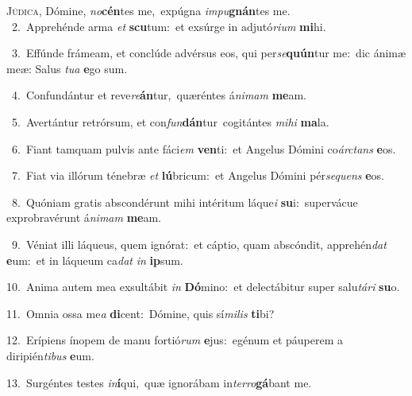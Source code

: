 \lettrine{\initial\textcolor{\initialcolor}{J}}{údica,} Dómine, \textit{no}\-\textbf{cén}tes me,~\star expúgna \textit{im}\-\textit{pu}\textbf{gnán}tes me.\\
{\numbfont\textcolor{\numbcolor}{~2.}}~Apprehénde arma \textit{et} \textbf{scu}\-tum:~\star et exsúrge in adjutó\-\textit{ri}\-\textit{um} \textbf{mi}\-hi.\par
{\numbfont\textcolor{\numbcolor}{~3.}}~Effúnde frámeam, et conclúde advérsus eos, qui per\-\textit{se}\-\textbf{quún}tur me:~\star dic ánimæ meæ: Salus \textit{tu}\-\textit{a} \textbf{e}\-go sum.\par
{\numbfont\textcolor{\numbcolor}{~4.}}~Confundántur et reve\-\textit{re}\-\textbf{án}tur,~\star quæréntes á\-\textit{ni}\-\textit{mam} \textbf{me}\-am.\par
{\numbfont\textcolor{\numbcolor}{~5.}}~Avertántur retrórsum, et con\-\textit{fun}\-\textbf{dán}tur~\star cogitántes \textit{mi}\-\textit{hi} \textbf{ma}\-la.\par
{\numbfont\textcolor{\numbcolor}{~6.}}~Fiant tamquam pulvis ante fáci\textit{em} \textbf{ven}\-ti:~\star et Angelus Dómini co\-\textit{árc}\-\textit{tans} \textbf{e}\-os.\par
{\numbfont\textcolor{\numbcolor}{~7.}}~Fiat via illórum ténebræ \textit{et} \textbf{lú}\-bricum:~\star et Angelus Dómini pér\-\textit{se}\-\textit{quens} \textbf{e}\-os.\par
{\numbfont\textcolor{\numbcolor}{~8.}}~Quóniam gratis abscondérunt mihi intéritum láque\textit{i} \textbf{su}\-i:~\star supervácue exprobravérunt á\-\textit{ni}\-\textit{mam} \textbf{me}\-am.\par
{\numbfont\textcolor{\numbcolor}{~9.}}~Véniat illi láqueus, quem ignórat:~\dagger et cáptio, quam abscóndit, apprehén\textit{dat} \textbf{e}\-um:~\star et in láqueum ca\textit{dat} \textit{in} \textbf{ip}\-sum.\par
{\numbfont\textcolor{\numbcolor}{10.}}~Anima autem mea exsultábit \textit{in} \textbf{Dó}\-mino:~\star et delectábitur super salu\-\textit{tá}\-\textit{ri} \textbf{su}\-o.\par
{\numbfont\textcolor{\numbcolor}{11.}}~Omnia ossa me\textit{a} \textbf{di}\-cent:~\star Dómine, quis sí\-\textit{mi}\-\textit{lis} \textbf{ti}\-bi?\par
{\numbfont\textcolor{\numbcolor}{12.}}~Erípiens ínopem de manu fortió\textit{rum} \textbf{e}\-jus:~\star egénum et páuperem a diripién\-\textit{ti}\-\textit{bus} \textbf{e}\-um.\par
{\numbfont\textcolor{\numbcolor}{13.}}~Surgéntes testes \textit{in}\-\textbf{í}qui,~\star quæ ignorábam in\-\textit{ter}\-\textit{ro}\textbf{gá}bant me.\par
